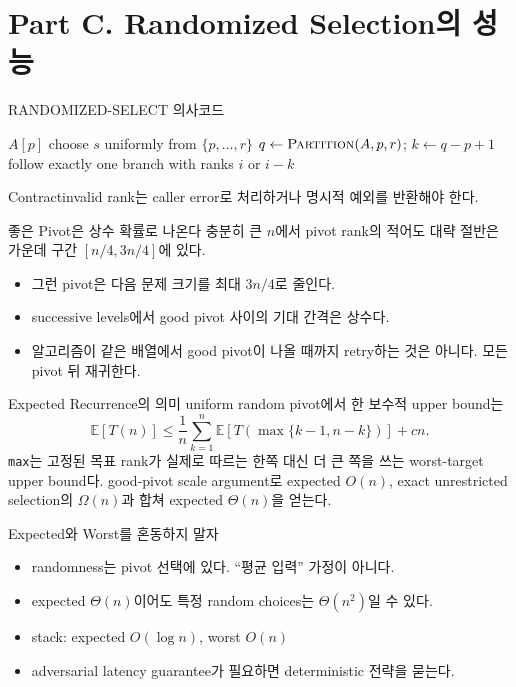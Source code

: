 \section{Part C. Randomized Selection의 성능}
\begin{frame}{RANDOMIZED-SELECT 의사코드}
\small\begin{algorithmic}[1]
\State \Return $A[p]$\EndIf
\State choose $s$ uniformly from $\{p,\dots,r\}$
\State {}
\State $q\gets\Call{Partition}{A,p,r}$; $k\gets q-p+1$
\State follow exactly one branch with ranks $i$ or $i-k$
\EndProcedure
\end{algorithmic}
\begin{block}{Contract}invalid rank는 caller error로 처리하거나 명시적 예외를 반환해야 한다.\end{block}
\end{frame}
\begin{frame}{좋은 Pivot은 상수 확률로 나온다}
충분히 큰 $n$에서 pivot rank의 적어도 대략 절반은 가운데 구간 $[n/4,3n/4]$에 있다.
\begin{itemize}
\item 그런 pivot은 다음 문제 크기를 최대 $3n/4$로 줄인다.
\item successive levels에서 good pivot 사이의 기대 간격은 상수다.
\item 알고리즘이 같은 배열에서 good pivot이 나올 때까지 retry하는 것은 아니다. 모든 pivot 뒤 재귀한다.
\end{itemize}
\end{frame}
\begin{frame}{Expected Recurrence의 의미}
\optional[Advanced]\hfill
uniform random pivot에서 한 보수적 upper bound는
\[\mathbb E[T(n)]\le\frac1n\sum_{k=1}^{n}\mathbb E\!\left[T\!\left(\max\{k-1,n-k\}\right)\right]+cn.\]
\texttt{max}는 고정된 목표 rank가 실제로 따르는 한쪽 대신 더 큰 쪽을 쓰는 worst-target \alert{upper bound}다. good-pivot scale argument로 expected $O(n)$, exact unrestricted selection의 $\Omega(n)$과 합쳐 expected $\Theta(n)$을 얻는다.
\end{frame}
\begin{frame}{Expected와 Worst를 혼동하지 말자}
\begin{itemize}\item randomness는 pivot 선택에 있다. “평균 입력” 가정이 아니다.\item expected $\Theta(n)$이어도 특정 random choices는 $\Theta(n^2)$일 수 있다.\item stack: expected $O(\log n)$, worst $O(n)$\item adversarial latency guarantee가 필요하면 deterministic 전략을 묻는다.\end{itemize}
\vfill{}
\end{frame}

